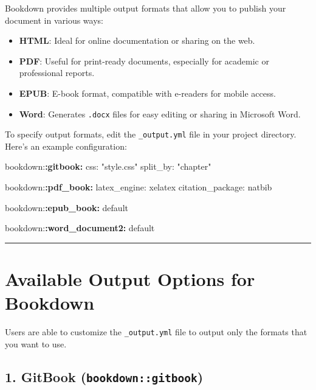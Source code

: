 \documentclass[
]{book}
\newenvironment{Shaded}{\begin{snugshade}}{\end{snugshade}}
\newcommand{\NormalTok}[1]{#1}
\newcommand{\SpecialCharTok}[1]{\textcolor[rgb]{0.81,0.36,0.00}{\textbf{#1}}}
\providecommand{\tightlist}{%
  \setlength{\itemsep}{0pt}\setlength{\parskip}{0pt}}
\theoremstyle{definition}
\theoremstyle{definition}
\theoremstyle{definition}
\theoremstyle{definition}
\theoremstyle{remark}
\begin{document}
Bookdown provides multiple output formats that allow you to publish your document in various ways:

\begin{itemize}
\tightlist
\item
  \textbf{HTML}: Ideal for online documentation or sharing on the web.
\item
  \textbf{PDF}: Useful for print-ready documents, especially for academic or professional reports.
\item
  \textbf{EPUB}: E-book format, compatible with e-readers for mobile access.
\item
  \textbf{Word}: Generates \texttt{.docx} files for easy editing or sharing in Microsoft Word.
\end{itemize}

To specify output formats, edit the \texttt{\_output.yml} file in your project directory. Here's an example configuration:

\begin{Shaded}
\begin{Highlighting}[]
\NormalTok{bookdown:}\SpecialCharTok{:gitbook:}
\NormalTok{  css: "style.css"}
\NormalTok{  split\_by: "chapter"}

\NormalTok{bookdown:}\SpecialCharTok{:pdf\_book:}
\NormalTok{  latex\_engine: xelatex}
\NormalTok{  citation\_package: natbib}

\NormalTok{bookdown:}\SpecialCharTok{:epub\_book:}\NormalTok{ default}

\NormalTok{bookdown:}\SpecialCharTok{:word\_document2:}\NormalTok{ default}
\end{Highlighting}
\end{Shaded}

\begin{center}\rule{0.5\linewidth}{0.5pt}\end{center}

\section{Available Output Options for Bookdown}\label{available-output-options-for-bookdown}

Users are able to customize the \texttt{\_output.yml} file to output only the formats that you want to use.

\subsection{\texorpdfstring{1. GitBook (\texttt{bookdown::gitbook})}{1. GitBook (bookdown::gitbook)}}\label{gitbook-bookdowngitbook}
\end{document}
